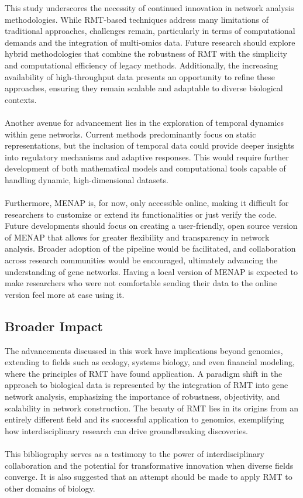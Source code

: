 This study underscores the necessity of continued innovation in network analysis methodologies.
While RMT-based techniques address many limitations of traditional approaches, challenges remain, particularly in terms of computational demands and the integration of multi-omics data.
Future research should explore hybrid methodologies that combine the robustness of RMT with the simplicity and computational efficiency of legacy methods.
Additionally, the increasing availability of high-throughput data presents an opportunity to refine these approaches, ensuring they remain scalable and adaptable to diverse biological contexts.
\\\\
\noindent Another avenue for advancement lies in the exploration of temporal dynamics within gene networks.
Current methods predominantly focus on static representations, but the inclusion of temporal data could provide deeper insights into regulatory mechanisms and adaptive responses.
This would require further development of both mathematical models and computational tools capable of handling dynamic, high-dimensional datasets.
\\\\
Furthermore, MENAP is, for now, only accessible online, making it difficult for researchers to customize or extend its functionalities or just verify the code.
Future developments should focus on creating a user-friendly, open source version of MENAP that allows for greater flexibility and transparency in network analysis.
Broader adoption of the pipeline would be facilitated, and collaboration across research communities would be encouraged, ultimately advancing the understanding of gene networks.
Having a local version of MENAP is expected to make researchers who were not comfortable sending their data to the online version feel more at ease using it.

\subsection*{Broader Impact}

The advancements discussed in this work have implications beyond genomics, extending to fields such as ecology, systems biology, and even financial modeling, where the principles of RMT have found application.
A paradigm shift in the approach to biological data is represented by the integration of RMT into gene network analysis, emphasizing the importance of robustness, objectivity, and scalability in network construction.
The beauty of RMT lies in its origins from an entirely different field and its successful application to genomics, exemplifying how interdisciplinary research can drive groundbreaking discoveries.
\\\\
\noindent This bibliography serves as a testimony to the power of interdisciplinary collaboration and the potential for transformative innovation when diverse fields converge.
It is also suggested that an attempt should be made to apply RMT to other domains of biology.